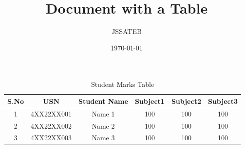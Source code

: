 \documentclass{article}
\title{Document with a Table}
\author{JSSATEB}
\date{\today}
\begin{document}
\maketitle

\begin{table}[h!]
    \centering
    \begin{tabular}{|c|c|c|c|c|c|}
        \hline
        S.No & USN & Student Name & Subject1 & Subject2 & Subject3 \\
        \hline
        1 & 4XX22XX001 & Name 1 & 100 & 100 & 100 \\
        2 & 4XX22XX002 & Name 2 & 100 & 100 & 100 \\
        3 & 4XX22XX003 & Name 3 & 100 & 100 & 100 \\
        \hline
    \end{tabular}
    \caption{Student Marks Table}
    \label{tab:marks}
\end{table}
\end{document}
